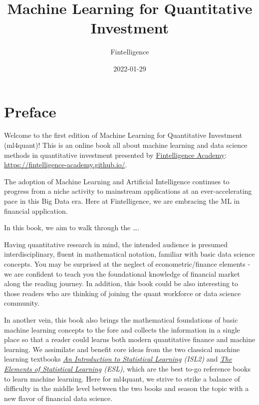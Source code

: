 \documentclass[
]{book}
\title{Machine Learning for Quantitative Investment}
\author{Fintelligence}
\date{2022-01-29}
\begin{document}
\maketitle

{
\setcounter{tocdepth}{1}
\tableofcontents
}
\hypertarget{preface}{%
\chapter*{Preface}\label{preface}}

Welcome to the first edition of {Machine Learning for Quantitative Investment (ml4quant)}! This is an online book all about machine learning and data science methods in quantitative investment presented by \href{https://fintelligence-academy.github.io/}{Fintelligence Academy}: \url{https://fintelligence-academy.github.io/}.

The adoption of Machine Learning and Artificial Intelligence continues to progress from a niche activity to mainstream applications at an ever-accelerating pace in this Big Data era. Here at Fintelligence, we are embracing the ML in financial application.

In this book, we aim to walk through the \ldots.

Having quantitative research in mind, the intended audience is presumed interdisciplinary, fluent in mathematical notation, familiar with basic data science concepts. You may be surprised at the neglect of econometric/finance elements - we are confident to teach you the foundational knowledge of financial market along the reading journey. In addition, this book could be also interesting to those readers who are thinking of joining the quant workforce or data science community.

In another vein, this book also brings the mathematical foundations of basic machine learning concepts to the fore and collects the information in a single place so that a reader could learns both modern quantitative finance and machine learning. We assimilate and benefit core ideas from the two classical machine learning textbooks \emph{\href{https://www.statlearning.com/}{An Introduction to Statistical Learning} (ISL2)} and \emph{\href{https://hastie.su.domains/Papers/ESLII.pdf}{The Elements of Statistical Learning} (ESL)}, which are the best to-go reference books to learn machine learning. Here for ml4quant, we strive to strike a balance of difficulty in the middle level between the two books and season the topic with a new flavor of financial data science.
\end{document}

